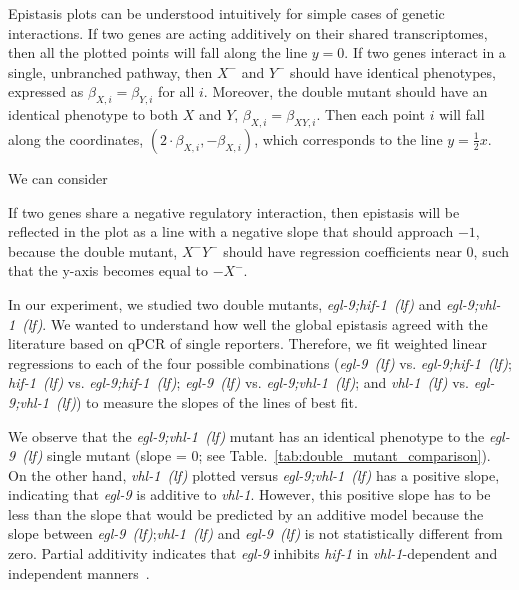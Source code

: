 \documentclass[9pt,twocolumn,twoside]{pnas-new}
\newcommand{\gene}[1]{\emph{#1}}
\newcommand{\egl}{\emph{egl-9~(lf)}}
\newcommand{\vhl}{\emph{vhl-1~(lf)}}
\newcommand{\eglvhl}{\emph{egl-9;vhl-1~(lf)}}
\newcommand{\eglhif}{\emph{egl-9;hif-1~(lf)}}
\newcommand{\hif}{\emph{hif-1~(lf)}}
\begin{document}
Epistasis plots can be understood intuitively for simple cases of genetic
interactions. If two genes are acting additively on their shared transcriptomes,
then all the plotted points will fall along the line $y=0$.
If two genes interact in a single, unbranched pathway, then $X^-$ and $Y^-$ should
have identical phenotypes, expressed as $\beta_{X,i} = \beta_{Y,i}$ for all
$i$. Moreover, the double mutant should have an identical phenotype to both
$X$ and $Y$, $\beta_{X,i} = \beta_{XY,i}$. Then each point $i$ will fall
along the coordinates, $(2\cdot\beta_{X,i}, -\beta_{X,i})$, which corresponds
to the line $y=\frac{1}{2}x$.

We can consider

If two genes share a negative regulatory interaction, then epistasis will be
reflected in the plot as a line with a negative slope that should approach $-1$,
because the double mutant, $X^-Y^-$ should have regression coefficients near 0,
such that the y-axis becomes equal to $-X^-$.

In our experiment, we studied two double mutants, \eglhif{} and \eglvhl{}.
We wanted to understand how well the global epistasis agreed with the literature
based on qPCR of single reporters. Therefore, we fit weighted linear regressions
to each of the four possible combinations (\egl{} vs. \eglhif{};
\hif{} vs. \eglhif{}; \egl{} vs. \eglvhl{}; and \vhl{} vs. \eglvhl{})
to measure the slopes of the lines of best fit.

We observe that the \eglvhl{} mutant has an identical phenotype to the
\egl{} single mutant (slope = 0; see Table.~\ref{tab:double_mutant_comparison}).
On the other hand, \vhl{} plotted versus \eglvhl{} has a positive slope,
indicating that \gene{egl-9} is additive to \gene{vhl-1}. However, this positive
slope has to be less than the slope that would be predicted by an additive model
because the slope between \egl{};\vhl{} and \egl{} is not statistically different
from zero. Partial additivity indicates that \gene{egl-9} inhibits \gene{hif-1}
in \gene{vhl-1}-dependent and independent manners~\cite{Shao2009}.
\end{document}
